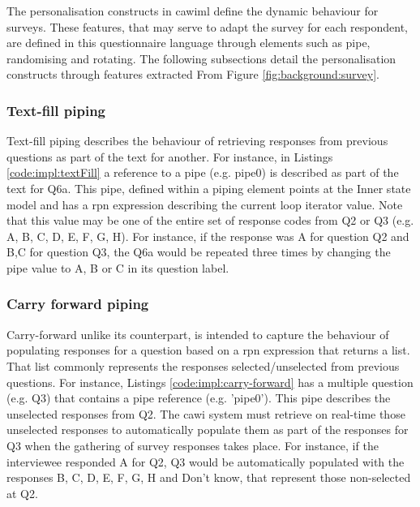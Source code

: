 	The personalisation constructs in \gls{cawiml} define the dynamic behaviour for surveys. These features, that may serve to adapt the survey for each respondent, are defined in this questionnaire language through elements such as pipe, randomising and rotating. The following subsections detail the personalisation constructs through features extracted From Figure \ref{fig:background:survey}.

	\subsubsection{Text-fill piping}
		Text-fill piping describes the behaviour of retrieving responses from previous questions as part of the text for another. For instance, in Listings \ref{code:impl:textFill} a reference to a pipe (e.g. pipe0) is described as part of the text for Q6a. This pipe, defined within a piping element points at the Inner state model and has a \gls{rpn} expression describing the current loop iterator value. Note that this value may be one of the entire set of response codes from Q2 or Q3 (e.g. A, B, C, D, E, F, G, H). For instance, if the response was A for question Q2 and B,C for question Q3, the Q6a would be repeated three times by changing the pipe value to A, B or C in its question label.
		
	\subsubsection{Carry forward piping}
		Carry-forward unlike its counterpart, is intended to capture the behaviour of populating responses for a question based on a \gls{rpn} expression that returns a list. That list commonly represents the responses selected/unselected from previous questions. For instance, Listings \ref{code:impl:carry-forward} has a multiple question (e.g. Q3) that contains a pipe reference (e.g. 'pipe0'). This pipe describes the unselected responses from Q2. The \gls{cawi} system must retrieve on real-time those unselected responses to automatically populate them as part of the responses for Q3 when the gathering of survey responses takes place. For instance, if the interviewee responded A for Q2, Q3 would be automatically populated with the responses B, C, D, E, F, G, H and Don't know, that represent those non-selected at Q2.
		
